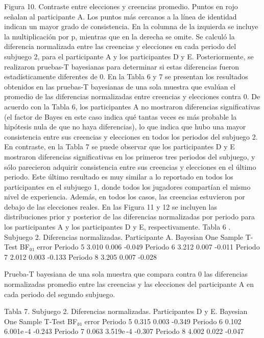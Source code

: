    
Figura 10. Contraste entre elecciones y creencias promedio. Puntos en rojo señalan al participante A. Los puntos más cercanos a la línea de identidad indican un mayor grado de consistencia. En la columna de la izquierda se incluye la multiplicación por p, mientras que en la derecha se omite.
Se calculó la diferencia normalizada entre las creencias y elecciones en cada periodo del subjuego 2, para el participante A y los participantes D y E. Posteriormente,  se realizaron pruebas-T bayesianas para determinar si estas diferencias fueron estadísticamente diferentes de 0.
En la Tabla 6 y 7 se presentan los resultados obtenidos en las pruebas-T bayesianas de una sola muestra que evalúan el promedio de las diferencias normalizadas entre creencias y elecciones contra 0. De acuerdo con la Tabla 6, los participantes A no mostraron diferencias significativas (el factor de Bayes en este caso indica qué tantas veces es más probable la hipótesis nula de que no haya diferencias), lo que indica que hubo una mayor consistencia entre sus creencias y elecciones en todos los periodos del subjuego 2. En contraste, en la Tabla 7 se puede observar que los participantes D y E mostraron diferencias significativas en los primeros tres periodos del subjuego, y sólo parecieron  adquirir consistencia entre sus creencias y elecciones en el último periodo. Este último resultado es muy similar a lo reportado en todos los participantes en el subjuego 1, donde todos los jugadores compartían el mismo nivel de experiencia. Además, en todos los casos, las creencias estuvieron por debajo de las elecciones reales. En las Figura 11 y 12 se incluyen las distribuciones prior y posterior de las diferencias normalizadas por periodo para los participantes A y los participantes D y E, respectivamente.
Tabla 6 . Subjuego 2. Diferencias normalizadas. Participante A.
Bayesian One Sample T-Test	
	BF₀₁	error %
Periodo 5		3.010		0.006		-0.049 
Periodo 6		3.212		0.007		-0.011 
Periodo 7		2.012		0.003		-0.133 
Periodo 8		3.205		0.007		-0.028 
	
Prueba-T bayesiana de una sola muestra que compara contra 0 las diferencias normalizadas promedio entre las creencias y las elecciones del participante A en cada periodo del segundo subjuego.

Tabla 7. Subjuego 2. Diferencias normalizadas. Participantes D y E.
Bayesian One Sample T-Test	
	BF₀₁	error %
Periodo 5		0.315		0.003		-0.349 
Periodo 6		0.102		6.001e -4		-0.243 
Periodo 7		0.063		3.519e -4		-0.307 
Periodo 8		4.002		0.022		-0.047 
	

